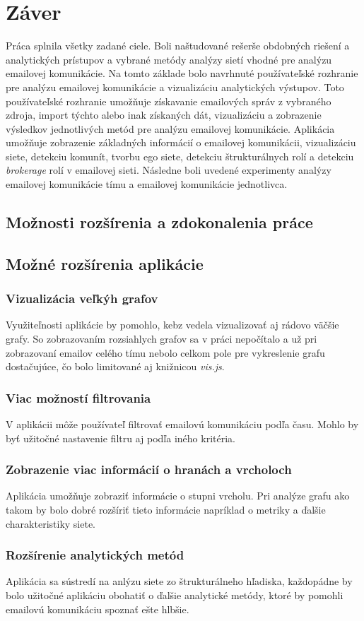 \documentclass[slovak,master,public,dept460,male,cpdeclaration,oneside]{diploma}
\begin{document}
\section{Záver}
Práca splnila všetky zadané ciele. Boli naštudované rešerše obdobných riešení a analytických prístupov a vybrané metódy analýzy sietí vhodné pre analýzu emailovej komunikácie. Na tomto základe bolo navrhnuté používateľské rozhranie pre analýzu emailovej komunikácie a vizualizáciu analytických výstupov. Toto používateľské rozhranie umožňuje získavanie emailových správ z vybraného zdroja, import týchto alebo inak získaných dát, vizualizáciu a zobrazenie výsledkov jednotlivých metód pre analýzu emailovej komunikácie. Aplikácia umožňuje zobrazenie základných informácií o emailovej komunikácii, vizualizáciu siete, detekciu komunít, tvorbu ego siete, detekciu štrukturálnych rolí a detekciu \textit{brokerage} rolí v emailovej sieti. Následne boli uvedené experimenty analýzy emailovej komunikácie tímu a emailovej komunikácie jednotlivca.

\subsection{Možnosti rozšírenia a zdokonalenia práce}

\subsection{Možné rozšírenia aplikácie}

\subsubsection{Vizualizácia veľkýh grafov}
Využiteľnosti aplikácie by pomohlo, kebz vedela vizualizovať aj rádovo väčšie grafy. So zobrazovaním rozsiahlych grafov sa v práci nepočítalo a už pri zobrazovaní emailov celého  tímu nebolo celkom pole pre vykreslenie grafu dostačujúce, čo bolo limitované aj knižnicou \textit{vis.js}.


\subsubsection{Viac možností filtrovania}
V aplikácii môže používateľ filtrovať emailovú komunikáciu podľa času. Mohlo by byť užitočné nastavenie filtru aj podľa iného kritéria.

\subsubsection{Zobrazenie viac informácií o hranách a vrcholoch}
Aplikácia umožňuje zobraziť informácie o stupni vrcholu. Pri analýze grafu ako takom by bolo dobré rozšíriť tieto informácie napríklad o metriky a ďalšie charakteristiky siete.


\subsubsection{Rozšírenie analytických metód}
Aplikácia sa sústredí na anlýzu siete zo štrukturálneho hľadiska, každopádne by bolo užitočné aplikáciu obohatiť o ďalšie analytické metódy, ktoré by pomohli emailovú komunikáciu spoznať ešte hlbšie.

 

\end{document}
